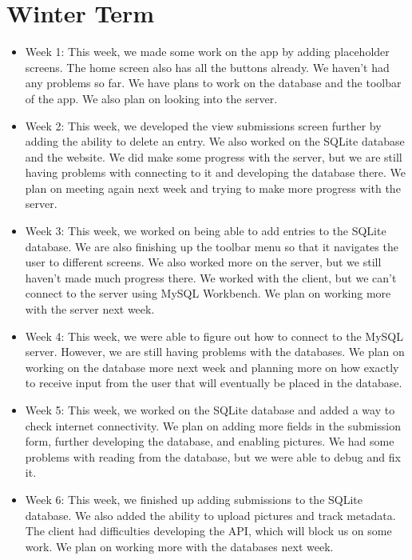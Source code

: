 \documentclass[onecolumn, draftclsnofoot,10pt, compsoc]{IEEEtran}
\begin{document}
\section{Winter Term}
 \begin{itemize}
     \item Week 1: This week, we made some work on the app by adding placeholder screens. The home screen also has all the buttons already. We haven't had any problems so far. We have plans to work on the database and the toolbar of the app. We also plan on looking into the server.
     
     \item Week 2: This week, we developed the view submissions screen further by adding the ability to delete an entry. We also worked on the SQLite database and the website. We did make some progress with the server, but we are still having problems with connecting to it and developing the database there. We plan on meeting again next week and trying to make more progress with the server.
     
     \item Week 3: This week, we worked on being able to add entries to the SQLite database. We are also finishing up the toolbar menu so that it navigates the user to different screens. We also worked more on the server, but we still haven't made much progress there. We worked with the client, but we can't connect to the server using MySQL Workbench. We plan on working more with the server next week.
     
     \item Week 4: This week, we were able to figure out how to connect to the MySQL server. However, we are still having problems with the databases. We plan on working on the database more next week and planning more on how exactly to receive input from the user that will eventually be placed in the database.
     
     \item Week 5: This week, we worked on the SQLite database and added a way to check internet connectivity. We plan on adding more fields in the submission form, further developing the database, and enabling pictures. We had some problems with reading from the database, but we were able to debug and fix it.
     
     \item Week 6: This week, we finished up adding submissions to the SQLite database. We also added the ability to upload pictures and track metadata. The client had difficulties developing the API, which will block us on some work. We plan on working more with the databases next week.
     

\end{itemize}
\end{document}
